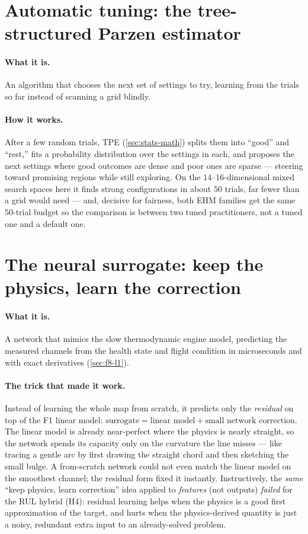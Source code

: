 \section{Automatic tuning: the tree-structured Parzen estimator}
\label{sec:ml-tpe}

\paragraph{What it is.} An algorithm that chooses the next set of settings to try, learning
from the trials so far instead of scanning a grid blindly.

\paragraph{How it works.} After a few random trials, TPE (\cref{sec:stats-math}) splits them
into ``good'' and ``rest,'' fits a probability distribution over the settings in each, and
proposes the next settings where good outcomes are dense and poor ones are sparse --- steering
toward promising regions while still exploring. On the $14$--$16$-dimensional mixed search
spaces here it finds strong configurations in about $50$ trials, far fewer than a grid would
need --- and, decisive for fairness, both EHM families get the same $50$-trial budget so the
comparison is between two tuned practitioners, not a tuned one and a default one.

\section{The neural surrogate: keep the physics, learn the correction}
\label{sec:ml-surrogate}

\paragraph{What it is.} A network that mimics the slow thermodynamic engine model, predicting
the measured channels from the health state and flight condition in microseconds and with
exact derivatives (\cref{sec:f8-l1}).

\paragraph{The trick that made it work.} Instead of learning the whole map from scratch, it
predicts only the \emph{residual} on top of the F1 linear model:
$\text{surrogate} = \text{linear model} + \text{small network correction}$. The linear model
is already near-perfect where the physics is nearly straight, so the network spends its
capacity only on the curvature the line misses --- like tracing a gentle arc by first drawing
the straight chord and then sketching the small bulge. A from-scratch network could not even
match the linear model on the smoothest channel; the residual form fixed it instantly.
Instructively, the \emph{same} ``keep physics, learn correction'' idea applied to
\emph{features} (not outputs) \emph{failed} for the RUL hybrid (H4): residual learning helps
when the physics is a good first approximation of the target, and hurts when the
physics-derived quantity is just a noisy, redundant extra input to an already-solved problem.

